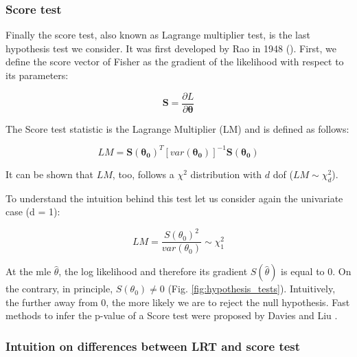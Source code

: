 \subsubsection{Score test}

Finally the score test, also known as Lagrange multiplier test, is the last hypothesis test we consider. 
It was first developed by Rao in 1948 (\cite{rao1948large}).
First, we define the score vector of Fisher as the gradient of the likelihood with respect to its parameters:

\begin{equation}\label{eq:score_vector}
    \mathbf{S} = \frac{\partial L}{\partial \boldsymbol{\theta}}
\end{equation}

The Score test statistic is the Lagrange Multiplier (LM) and is defined as follows:

\begin{equation}\label{eq:lagrange_multiplier}
    LM = \mathbf{S}(\boldsymbol{\theta_0})^T [var(\boldsymbol{\theta_0})]^{-1}\mathbf{S}(\boldsymbol{\theta_0}) 
\end{equation}

It can be shown that $LM$, too, follows a $\chi^2$ distribution with $d$ dof ($LM \sim \chi^2_d$).

To understand the intuition behind this test let us consider again the univariate case (d = 1):

\begin{equation}\label{eq:lagrange_multiplier_univariate}
    LM = \frac{S(\theta_0)^2}{var(\theta_0)} \sim \chi^2_1
\end{equation}

At the \gls{mle} $\hat{\theta}$, the log likelihood and therefore its gradient $S(\hat{\theta})$ is equal to 0.
On the contrary, in principle, $ S(\theta_0) \neq 0 $ (Fig. \ref{fig:hypothesis_tests}). 
Intuitively, the further away from 0, the more likely we are to reject the null hypothesis.
Fast methods to infer the p-value of a Score test were proposed by Davies  \cite{davies1980algorithm} and Liu \cite{liu2009new}.



\subsubsection{Intuition on differences between LRT and score test}

